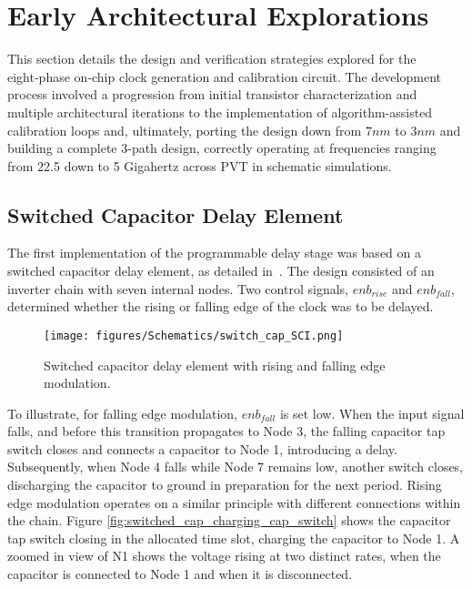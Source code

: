 \section{Early Architectural Explorations}\label{sec:methodology}

This section details the design and verification strategies explored for the eight‑phase on‑chip clock generation and calibration circuit. The development process involved a progression from initial transistor characterization and multiple architectural iterations to the implementation of algorithm-assisted calibration loops and, ultimately, porting the design down from $7nm$ to $3nm$ and building a complete 3-path design, correctly operating at frequencies ranging from 22.5 down to 5 Gigahertz across PVT in schematic simulations.

\subsection{Switched Capacitor Delay Element}\label{sec:switched_cap}

The first implementation of the programmable delay stage was based on a switched capacitor delay element, as detailed in~\cite{Ramazanoglu2018switched}. The design consisted of an inverter chain with seven internal nodes. Two control signals, $enb_{rise}$ and $enb_{fall}$, determined whether the rising or falling edge of the clock was to be delayed.

\begin{figure}
  \centering
  \texttt{[image: figures/Schematics/switch\_cap\_SCI.png]}
  \caption{Switched capacitor delay element with rising and falling edge modulation.}
  \label{fig:switched_cap_delay_element}
\end{figure}

To illustrate, for falling edge modulation, $enb_{fall}$ is set low. When the input signal falls, and before this transition propagates to Node 3, the falling capacitor tap switch closes and connects a capacitor to Node 1, introducing a delay. Subsequently, when Node 4 falls while Node 7 remains low, another switch closes, discharging the capacitor to ground in preparation for the next period. Rising edge modulation operates on a similar principle with different connections within the chain. Figure \ref{fig:switched_cap_charging_cap_switch} shows the capacitor tap switch closing in the allocated time slot, charging the capacitor to Node 1. A zoomed in view of N1 shows the voltage rising at two distinct rates, when the capacitor is connected to Node 1 and when it is disconnected.

